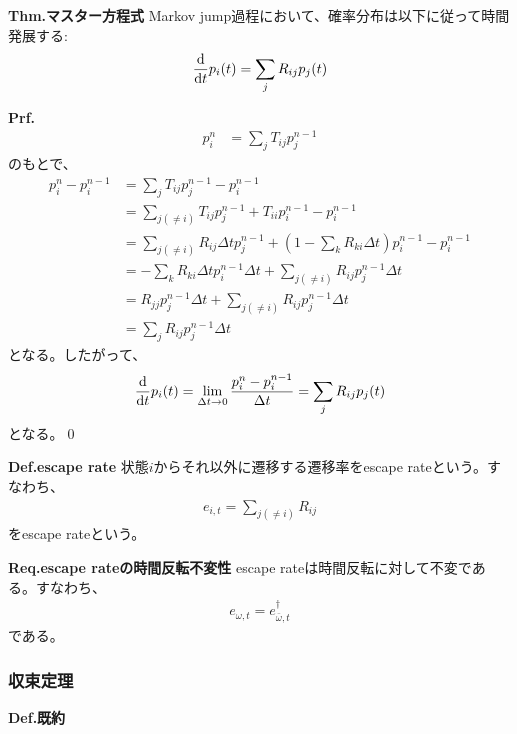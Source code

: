 \documentclass[a4paper,11pt]{jsarticle}
\numberwithin{equation}{section}
\begin{document}
\begin{itembox}[l]{\textbf{Thm.マスター方程式}}
  Markov jump過程において、確率分布は以下に従って時間発展する:
  \begin{align}
    \dv{t}p_i(t) = \sum_{j}R_{ij}p_j(t) 
  \end{align}
\end{itembox}
\textbf{Prf.}\\
\begin{align}
  p_i^{n} &= \sum_{j}T_{ij}p_j^{n-1}
\end{align}
のもとで、
\begin{align}
  p_i^n - p_i^{n-1} &= \sum_{j}T_{ij}p_j^{n-1} - p_i^{n-1}\\
  &= \sum_{j(\neq i)}T_{ij}p_j^{n-1} + T_{ii}p_i^{n-1} - p_i^{n-1}\\
  &= \sum_{j(\neq i)}R_{ij}\Delta t p_j^{n-1} + (1-\sum_{k}R_{ki}\Delta t)p_i^{n-1} - p_i^{n-1}\\
  &= -\sum_{k}R_{ki}\Delta t p_i^{n-1} \Delta t + \sum_{j(\neq i)}R_{ij}p_j^{n-1}\Delta t\\
  &= R_{jj}p_j^{n-1}\Delta t + \sum_{j(\neq i)}R_{ij}p_j^{n-1}\Delta t\\
  &= \sum_{j}R_{ij}p_j^{n-1}\Delta t
\end{align}
となる。したがって、
\begin{align}
  \dv{t}p_i(t) = \lim_{\Delta t \to 0}\frac{p_i^n - p_i^{n-1}}{\Delta t} = \sum_{j}R_{ij}p_j(t)
\end{align}
となる。\qed\\

\begin{itembox}[l]{\textbf{Def.escape rate}}
  状態$i$からそれ以外に遷移する遷移率をescape rateという。すなわち、
  \begin{align}
    e_{i,t} = \sum_{j (\neq i)}R_{ij}
  \end{align}
  をescape rateという。
\end{itembox}

\begin{itembox}[l]{\textbf{Req.escape rateの時間反転不変性}}
  escape rateは時間反転に対して不変である。すなわち、
  \begin{align}
    e_{\omega,t} = e_{\bar{\omega},t}^{\dagger}
  \end{align}
  である。
\end{itembox}


\subsubsection{収束定理}
\begin{itembox}[l]{\textbf{Def.既約}}

\end{itembox}
\end{document}
